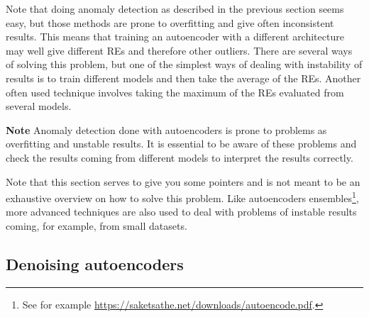 \documentclass[12pt,a4]{article}
\newenvironment{note}
{\begin{mdframed}[backgroundcolor=light-gray, roundcorner=10pt,leftmargin=1, rightmargin=1, innerleftmargin=15, innertopmargin=15,innerbottommargin=15, outerlinewidth=1, linecolor=light-gray]}
{\end{mdframed}}
\begin{document}
Note that doing anomaly detection as described in the previous section seems easy, but those methods are prone to overfitting and give often inconsistent results. This means that training an autoencoder with a different architecture may well give different REs and therefore other outliers. There are several ways of solving this problem, but one of the simplest ways of dealing with instability of results is to train different models and then take the average of the REs. Another often used technique involves taking the maximum of the REs evaluated from several models. 
\begin{note}
\textbf{Note }Anomaly detection done with autoencoders is prone to problems as overfitting and unstable results. It is essential to be aware of these problems and check the results coming from different models to interpret the results correctly.
\end{note}
Note that this section serves to give you some pointers and is not meant to be an exhaustive overview on how to solve this problem.
Like autoencoders ensembles\footnote{ See for example \url{https://saketsathe.net/downloads/autoencode.pdf}.}, more advanced techniques are also used to deal with problems of instable results coming, for example, from small datasets.

\subsection{Denoising autoencoders}
\end{document}
